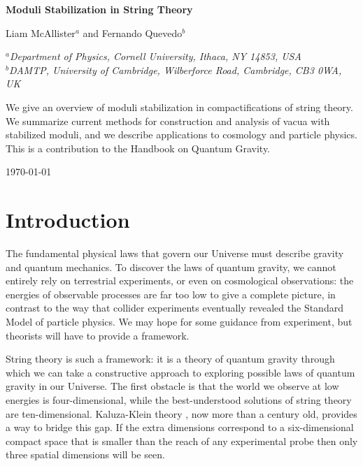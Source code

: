 \documentclass[12pt,a4wide]{article}
\begin{document}
\pagestyle{plain}
\begin{center}
\medskip
{\bf\LARGE{Moduli Stabilization in String Theory}}
\vspace{10mm}
 

\end{center} 

\begin{center}
Liam McAllister$^{a}$ and Fernando Quevedo$^{b}$
\end{center}

\begin{center}


\vspace{0.15 cm}
{\fontsize{11}{30}
\noindent\textsl{$^{a}$Department of Physics, Cornell University, Ithaca, NY 14853, USA}\\
\noindent\textsl{$^{b}$DAMTP, University of Cambridge, Wilberforce Road, Cambridge, CB3 0WA, UK}}\\
\end{center}

\vspace{1cm}
\noindent We give an 
overview of moduli stabilization in compactifications of string theory.
We summarize current methods for construction and analysis of vacua with stabilized moduli, and we describe applications to cosmology
and particle physics.
This is a contribution to the Handbook on Quantum Gravity.
 
\vspace{8.25cm}
\noindent\today
\newpage

\tableofcontents
\newpage
\section{Introduction}

The fundamental physical laws that govern our Universe must describe gravity and quantum mechanics.  
To discover the laws of quantum gravity, we cannot entirely rely on terrestrial experiments, or even on cosmological observations: the energies of observable processes are far too low to give a complete picture, in contrast to the way that collider experiments eventually revealed the Standard Model of particle physics.  We may hope for some guidance from experiment, but theorists will have to provide a framework.

String theory is such a framework: it is a theory of quantum gravity through which 
we can take a constructive approach to exploring possible laws of quantum gravity in our Universe.
The first obstacle is that the world we observe at low energies is four-dimensional, while the best-understood solutions of string theory are ten-dimensional.  
Kaluza-Klein theory \cite{Kaluza:1921tu,Klein:1926tv}, now more than a century old, provides a way to bridge this gap.  If the extra dimensions correspond to a six-dimensional compact space that is smaller than the reach of any  experimental probe 
then only three spatial dimensions will be seen.
\end{document}

